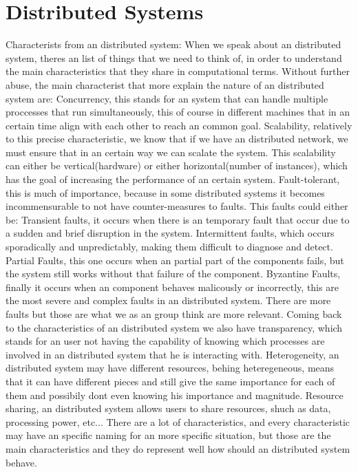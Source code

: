 \section{Distributed Systems}

\quad{} Characterists from an distributed system:
 When we speak about an distributed system, theres an list of things that we need to think of, in order to understand the main characteristics that they share in computational terms. Without further abuse, the main characterist that more explain the nature of an distributed system are:
  Concurrency, this stands for an system that can handle multiple proccesses that run simultaneously, this of course in different machines that in an certain time align with each other to reach an common goal.
  Scalability, relatively to this precise characteristic, we know that if we have an distributed network, we must ensure that in an certain way we can scalate the system. This scalability can either be vertical(hardware) or either horizontal(number of instances), which has the goal of increasing the performance of an certain system.
  Fault-tolerant, this is much of importance, because in some distributed systems it becomes incommensurable to not have counter-measures to faults. This faults could either be:
  Transient faults, it occurs when there is an temporary fault that occur due to a sudden and brief disruption in the system.
  Intermittent faults, which occurs sporadically and unpredictably, making them difficult to diagnose and detect.
  Partial Faults, this one occurs when an partial part of the components fails, but the system still works without that failure of the component.
  Byzantine Faults, finally it occurs when an component behaves malicously or incorrectly, this are the most severe and complex faults in an distributed system.
  There are more faults but those are what we as an group think are more relevant.
  Coming back to the characteristics of an distributed system we also have transparency, which stands for an user not having the capability of knowing which processes are involved in an distributed system that he is interacting with.
  Heterogeneity, an distributed system may have different resources, behing heteregeneous, means that it can have different pieces and still give the same importance for each of them and possibily dont even knowing his importance and magnitude.
  Resource sharing, an distributed system allows users to share resources, shuch as data, processing power, etc...
  There are a lot of characteristics, and every characteristic may have an specific naming for an more specific situation, but those are the main characteristics and they do represent well how should an distributed system behave.